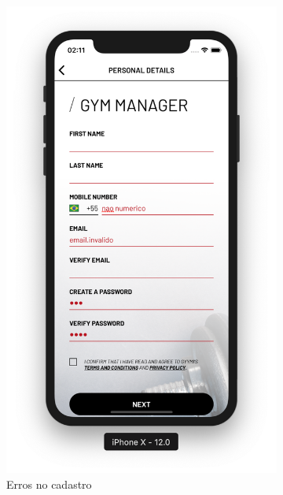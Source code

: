 \begin{figure}[H]
	\centering
    \begin{subfigure}[b]{0.4\textwidth}
        \includegraphics[width=\textwidth]{pfc/figuras/register-errors.png}
        \caption{Erros no cadastro}
        \label{fig:register-errors}
    \end{subfigure}
    ~
	\begin{subfigure}[b]{0.4\textwidth}

\end{subfigure}
\end{figure}
